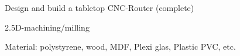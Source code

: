 \begin{cventries}
  \cventry
    {} %
    {Design and build a tabletop CNC-Router (complete)} %
    {} %
    {} %
    {\vspace{-12pt}
      \begin{cvitems} %
        \item {2.5D-machining/milling}
        \item {Material: polystyrene, wood, MDF, Plexi glas, Plastic PVC, etc.}
      \end{cvitems}
    }

\end{cventries}
